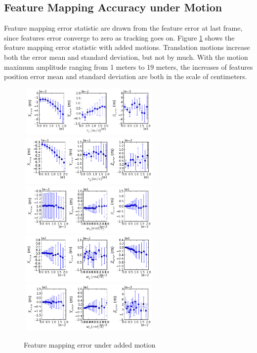 \subsection{Feature Mapping Accuracy under Motion}

Feature mapping error statistic are drawn from the feature error at
last frame, since features error converge to zero as tracking goes on.
Figure \ref{fig:simfig20-24} shows the feature mapping error statistic
with added motions. Translation motions increase both the error mean
and standard deviation, but not by much. With the motion maximum
amplitude ranging from 1 meters to 19 meters, the increases of
features position error mean and standard deviation are both in the
scale of centimeters.

\begin{figure}[h]
  \centering
  \includegraphics[width=7cm, height=2.5cm]{./Figures/SimulationFigures/Figure20.png}
  \includegraphics[width=7cm, height=2.5cm]{./Figures/SimulationFigures/Figure21.png}
  \includegraphics[width=7cm, height=2.5cm]{./Figures/SimulationFigures/Figure22.png}
  \includegraphics[width=7cm, height=2.5cm]{./Figures/SimulationFigures/Figure23.png}
  \includegraphics[width=7cm, height=2.5cm]{./Figures/SimulationFigures/Figure24.png}
  \caption{Feature mapping error under added motion}
  \label{fig:simfig20-24}
\end{figure}


